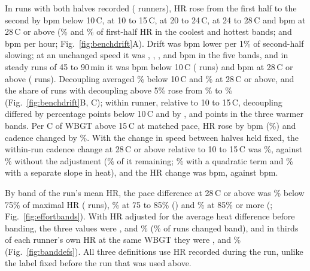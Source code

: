 \documentclass[12pt]{article}
\newcommand{\degC}{\,\textdegree C}
\begin{document}
In \benchDriftRuns{} runs with both halves recorded (\benchDriftRunners{} runners), HR rose from the first half to the second by \hrDriftBpmCold{} bpm below 10\degC, \hrDriftBpmCool{} at 10 to 15\degC, \hrDriftBpmWarm{} at 20 to 24\degC, \hrDriftBpmHot{} at 24 to 28\degC{} and \hrDriftBpmSevere{} bpm at 28\degC{} or above (\hrDriftPctCold\% and \hrDriftPctSevere\% of first-half HR in the coolest and hottest bands; \hrDriftPerHCold{} and \hrDriftPerHSevere{} bpm per hour; Fig.~\ref{fig:benchdrift}A). Drift was \benchHRPerSpeed{} bpm lower per 1\% of second-half slowing; at an unchanged speed it was \hrDriftFixedCold, \hrDriftFixedCool, \hrDriftFixedWarm, \hrDriftFixedHot{} and \hrDriftFixedSevere{} bpm in the five bands, and in steady runs of 45 to 90\,min it was \hrSteadyBpmCold{} bpm below 10\degC{} (\hrSteadyNCold{} runs) and \hrSteadyBpmSevere{} bpm at 28\degC{} or above (\hrSteadyNSevere{} runs). Decoupling averaged \decoupCold\% below 10\degC{} and \decoupSevere\% at 28\degC{} or above, and the share of runs with decoupling above 5\% rose from \decoupOverFiveCold\% to \decoupOverFiveSevere\% (Fig.~\ref{fig:benchdrift}B, C); within runner, relative to 10 to 15\degC, decoupling differed by \decoupWithinCold{} percentage points below 10\degC{} and by \decoupWithinWarm, \decoupWithinHot{} and \decoupWithinSevere{} points in the three warmer bands. Per \textdegree C of WBGT above 15\degC{} at matched pace, HR rose by \perDegHR{} bpm (\perDegHRPct\%) and cadence changed by \perDegCad\%. With the change in speed between halves held fixed, the within-run cadence change at 28\degC{} or above relative to 10 to 15\degC{} was \trainCadFixed\%, against \trainCadObs\% without the adjustment (\trainCadRemain\% of it remaining; \trainCadFixedQuad\% with a quadratic term and \trainCadFixedFree\% with a separate slope in heat), and the HR change was \trainHRFixed{} bpm, against \trainHRObs{} bpm.

By band of the run's mean HR, the pace difference at 28\degC{} or above was \bandEasyHot\% below 75\% of maximal HR (\bandEasyRuns{} runs), \bandModHot\% at 75 to 85\% (\bandModRuns) and \bandHardHot\% at 85\% or more (\bandHardRuns; Fig.~\ref{fig:effortbands}). With HR adjusted for the average heat difference before banding, the three values were \bandAdjEasyHot, \bandAdjModHot{} and \bandAdjHardHot\% (\bandMovedPct\% of runs changed band), and in thirds of each runner's own HR at the same WBGT they were \bandOwnEasyHot, \bandOwnModHot{} and \bandOwnHardHot\% (Fig.~\ref{fig:banddefs}). All three definitions use HR recorded during the run, unlike the label fixed before the run that was used above.
\end{document}
